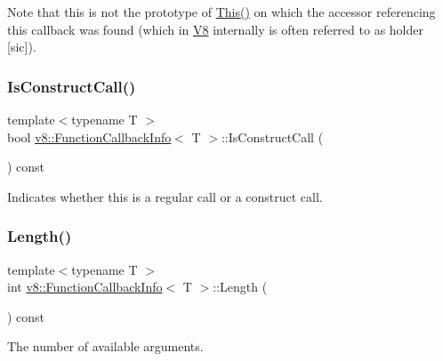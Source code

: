 Note that this is not the prototype of \mbox{\hyperlink{classv8_1_1FunctionCallbackInfo_a4ddfd6d21732dff1c4c55d5441a8a5ca}{This()}} on which the accessor referencing this callback was found (which in \mbox{\hyperlink{classv8_1_1V8}{V8}} internally is often referred to as holder \mbox{[}sic\mbox{]}). \mbox{\label{classv8_1_1FunctionCallbackInfo_ad2105b93e9b4d02f42b7338fa5950cbc}} 
\subsubsection{\texorpdfstring{Is\+Construct\+Call()}{IsConstructCall()}}
{\footnotesize\ttfamily template$<$typename T $>$ \\
bool \mbox{\hyperlink{classv8_1_1FunctionCallbackInfo}{v8\+::\+Function\+Callback\+Info}}$<$ T $>$\+::Is\+Construct\+Call (\begin{DoxyParamCaption}{ }\end{DoxyParamCaption}) const}

Indicates whether this is a regular call or a construct call. \mbox{\label{classv8_1_1FunctionCallbackInfo_af97dd3f1cb01ed039f9479152ad63a84}} 
\subsubsection{\texorpdfstring{Length()}{Length()}}
{\footnotesize\ttfamily template$<$typename T $>$ \\
int \mbox{\hyperlink{classv8_1_1FunctionCallbackInfo}{v8\+::\+Function\+Callback\+Info}}$<$ T $>$\+::Length (\begin{DoxyParamCaption}{ }\end{DoxyParamCaption}) const}

The number of available arguments. \mbox{\label{classv8_1_1FunctionCallbackInfo_aa04f4c5c984db26a90b591f34550e6fa}} 
